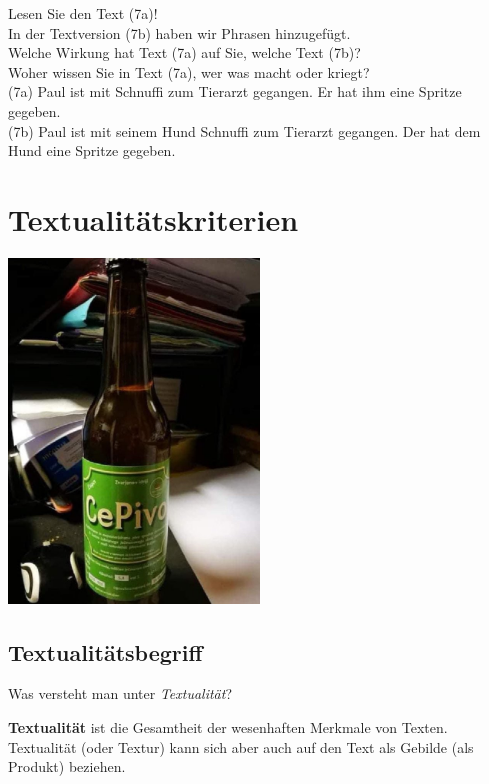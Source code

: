 \documentclass[
  letterpaper,
  DIV=11,
  numbers=noendperiod]{scrreprt}
\begin{document}
Lesen Sie den Text (7a)!\\
In der Textversion (7b) haben wir Phrasen hinzugefügt.\\
Welche Wirkung hat Text (7a) auf Sie, welche Text (7b)?\\
Woher wissen Sie in Text (7a), wer was macht oder kriegt?\\

(7a) Paul ist mit Schnuffi zum Tierarzt gegangen. Er hat ihm eine
Spritze gegeben.\\

(7b) Paul ist mit seinem Hund Schnuffi zum Tierarzt gegangen. Der hat
dem Hund eine Spritze gegeben.\\


\hypertarget{sec-textkriterien}{%
\chapter{Textualitätskriterien}\label{sec-textkriterien}}

\includegraphics[width=0.5\textwidth,height=\textheight]{./pictures/CePivo.jpg}

\hypertarget{textualituxe4tsbegriff}{%
\section{Textualitätsbegriff}\label{textualituxe4tsbegriff}}

Was versteht man unter \emph{Textualität}?

\textbf{Textualität} ist die Gesamtheit der wesenhaften Merkmale von
Texten. Textualität (oder Textur) kann sich aber auch auf den Text als
Gebilde (als Produkt) beziehen.
\end{document}
